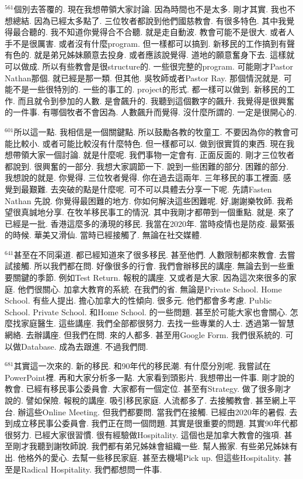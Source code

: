 \documentclass{book}
\begin{document}
$^{561}$個別去答覆的.
現在我想帶領大家討論.
因為時間也不是太多.
剛才其實.
我也不想總結.
因為已經太多點了.
三位牧者都說到他們國慈教會.
有很多特色.
其中我覺得最合聽的.
我不知道你覺得合不合聽.
就是走自動波.
教會可能不是很大.
或者人手不是很厲害.
或者沒有什麼program.
但一樣都可以搞到.
新移民的工作搞到有聲有色的.
就是弟兄姊妹願意去投身.
或者應該說覺得.
道地的願意奮身下去.
這樣就可以做成.
所以有些教會是很structure的.
一些很完整的program.
可能剛才Pastor Nathan那個.
就已經是那一類.
但其他.
吳牧師或者Pastor Ray.
那個情況就是.
可能不是一些很特別的.
一些的事工的.
project的形式.
都一樣可以做到.
新移民的工作.
而且就令到參加的人數.
是會飆升的.
我聽到這個數字的飆升.
我覺得是很興奮的一件事.
有哪個牧者不會因為.
人數飆升而覺得.
沒什麼所謂的.
一定是很開心的.

$^{601}$所以這一點.
我相信是一個關鍵點.
所以鼓勵各教的牧童工.
不要因為你的教會可能比較小.
或者可能比較沒有什麼特色.
但一樣都可以.
做到很實質的東西.
現在我想帶領大家一個討論.
就是什麼呢.
我們事物一定會有.
正面反面的.
剛才三位牧者都說到.
很興奮的一部分.
我想大家調節一下.
說到一些困難的部分.
困難的部分.
我想說的就是.
你覺得.
三位牧者覺得.
你在過去這兩年.
三年移民的事工裡面.
感覺到最艱難.
去突破的點是什麼呢.
可不可以具體去分享一下呢.
先請Fasten Nathan 先說.
你覺得最困難的地方.
你如何解決這些困難呢.
好,謝謝樂牧師.
我希望很真誠地分享.
在牧羊移民事工的情況.
其中我剛才都帶到一個重點.
就是.
來了已經是一批.
香港這麼多的湧現的移民.
我當在2020年.
當時疫情也是防疫.
最緊張的時候.
華美又滑仙.
當時已經接觸了.
無論在社交媒體.

$^{641}$甚至在不同渠道.
都已經知道來了很多移民.
甚至他們.
人數限制都來教會.
去嘗試接觸.
所以我們都在問.
好像很多的行會.
我們會辦移民的講座.
無論去到一些重要關鍵的季節.
例如Test Return.
報稅的講座.
又或者是大家.
因為這次來很多的家庭.
他們很關心.
加拿大教育的系統.
在我們的省.
無論是Private School.
Home School.
有些人提出.
擔心加拿大的性傾向.
很多元.
他們都會多考慮.
Public School.
Private School.
和Home School.
的一些問題.
甚至於可能大家也會關心.
怎麼找家庭醫生.
這些講座.
我們全部都很努力.
去找一些專業的人士.
透過第一智慧網絡.
去辦講座.
但我們在問.
來的人都多.
甚至用Google Form.
我們很系統的.
可以做Database.
成為去跟進.
不過我們問.

$^{681}$其實這一次來的.
新的移民.
和90年代的移民潮.
有什麼分別呢.
我嘗試在PowerPoint裡.
再和大家分析多一點.
大家看到頭影片.
我想帶出一件事.
剛才說的教會.
已經有移民事公委員會.
大家都有一個定位.
甚至有Strategy.
做了很多剛才說的.
譬如保險.
報稅的講座.
吸引移民家庭.
人流都多了.
去接觸教會.
甚至網上平台.
辦這些Online Meeting.
但我們都要問.
當我們在接觸.
已經由2020年的暑假.
去到成立移民事公委員會.
我們正在問一個問題.
其實是很重要的問題.
其實90年代都很努力.
已經大家很習慣.
很有經驗做Hospitality.
這個也是加拿大教會的強項.
甚至剛才我聽到謝牧師說.
我們都有弟兄姊妹會組織一些.
幫人搬家.
有些弟兄姊妹有出.
他格外的愛心.
去幫一些移民家庭.
甚至去機場Pick up.
但這些Hospitality.
甚至是Radical Hospitality.
我們都想問一件事.
\end{document}
